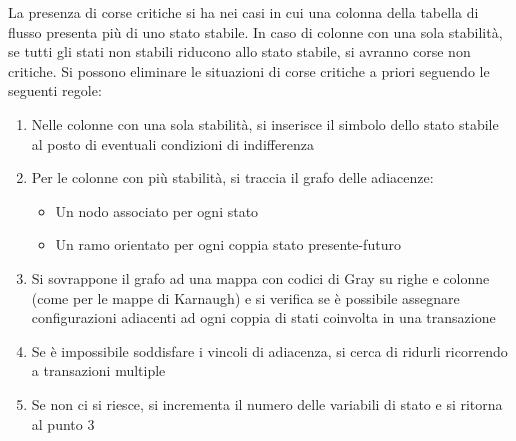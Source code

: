 \documentclass{subfiles}
\begin{document}
La presenza di corse critiche si ha nei casi in cui una colonna della tabella di flusso presenta più di uno stato stabile.
In caso di colonne con una sola stabilità, se tutti gli stati non stabili riducono allo stato stabile, si avranno corse non critiche.
Si possono eliminare le situazioni di corse critiche a priori seguendo le seguenti regole:

\begin{enumerate}
    \item Nelle colonne con una sola stabilità, si inserisce il simbolo dello stato stabile al posto di eventuali condizioni di indifferenza
    \item Per le colonne con più stabilità, si traccia il grafo delle adiacenze:

    \begin{itemize}
        \item Un nodo associato per ogni stato
        \item Un ramo orientato per ogni coppia stato presente-futuro
    \end{itemize}

    \item Si sovrappone il grafo ad una mappa con codici di Gray su righe e colonne (come per le mappe di Karnaugh) e si verifica se è possibile assegnare configurazioni adiacenti ad ogni coppia di stati coinvolta in una transazione
    \item Se è impossibile soddisfare i vincoli di adiacenza, si cerca di ridurli ricorrendo a transazioni multiple
    \item Se non ci si riesce, si incrementa il numero delle variabili di stato e si ritorna al punto 3
\end{enumerate}
\end{document}
